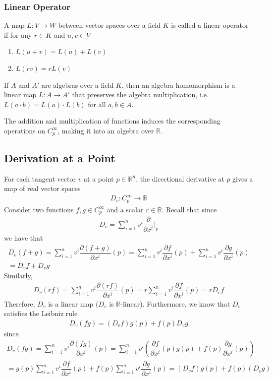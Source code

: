 \documentclass{article}
\newcommand{\R}{\mathbb{R}}
\newcommand{\Cinfty}{C^{\infty}}
\begin{document}
	\subsubsection*{Linear Operator}
	A map $L: V \to W$ between vector spaces over a field $K$ is called a linear operator if for any $r \in K$ and $u, v \in V$
	\begin{enumerate}
		\item $L(u + v) = L(u) + L(v)$
		\item $L(rv) = rL(v)$
	\end{enumerate}
	
	If $A$ and $A'$ are algebras over a field $K$, then an algebra homomorphism is a linear map $L: A \to A'$ that preserves the algebra multiplication, i.e. $L(a \cdot b) = L(a) \cdot L(b)$ for all $a, b \in A$.
	
	The addition and multiplication of functions induces the corresponding operations on $\Cinfty_p$, making it into an algebra over $\R$.
	
	\subsection*{Derivation at a Point}
	For each tangent vector $v$ at a point $p \in \R^n$, the directional derivative at $p$ gives a map of real vector spaces
	\begin{gather*}
		D_v: \Cinfty_p \to \R
	\end{gather*}
	Consider two functions $f, g \in \Cinfty_p$ and a scalar $r \in \R$. Recall that since
	\begin{gather*}
		D_v = \sum_{i = 1}^n v^i \dfrac{\partial}{\partial x^i} \Bigg|_p
	\end{gather*}
	we have that
	\begin{gather*}
		D_v (f + g) = \sum_{i = 1}^n v^i \dfrac{\partial (f + g)}{\partial x^i}(p) = \sum_{i = 1}^n v^i \dfrac{\partial f}{\partial x^i}(p) + \sum_{i = 1}^n v^i \dfrac{\partial g}{\partial x^i}(p) \\
		= D_v f + D_v g
	\end{gather*}
	Similarly,
	\begin{gather*}
		D_v (rf) = \sum_{i = 1}^n v^i \dfrac{\partial (rf)}{\partial x^i}(p) = r \sum_{i = 1}^n v^i \dfrac{\partial f}{\partial x^i}(p) = r D_v f
	\end{gather*}
	Therefore, $D_v$ is a linear map ($D_v$ is $\R$-linear). Furthermore, we know that $D_v$ satisfies the Leibniz rule
	\begin{gather*}
		D_v (fg) = (D_v f) g(p) + f(p) D_v g
	\end{gather*}
	since
	\begin{gather*}
		D_v (fg) = \sum_{i = 1}^n v^i \dfrac{\partial (fg)}{\partial x^i}(p) = \sum_{i = 1}^n v^i \left( \dfrac{\partial f}{\partial x^i}(p) g(p) + f(p) \dfrac{\partial g}{\partial x^i}(p) \right) \\
		= g(p) \sum_{i = 1}^n v^i \dfrac{\partial f}{\partial x^i}(p) + f(p) \sum_{i = 1}^n v^i \dfrac{\partial g}{\partial x^i}(p) = (D_v f) g(p) + f(p) (D_v g)
	\end{gather*}
	
\end{document}
